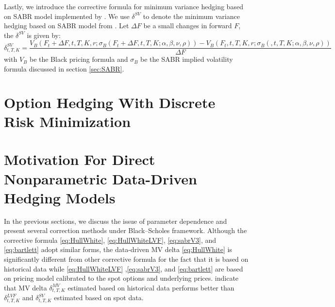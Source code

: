 \documentclass[letterpaper,12pt,titlepage,oneside,final]{book}
\numberwithin{equation}{section}
\theoremstyle{definition}
\begin{document}
Lastly, we introduce the corrective formula for minimum variance hedging  based on  SABR model implemented by  \citet{hulloptimal} . We use $\delta^{SV}$ to denote the minimum variance hedging  based on  SABR model from \cite{hulloptimal}. Let $\Delta F$ be a small changes in forward $F$, the  $\delta^{SV}$ is given by:
\begin{equation}
	\delta^{SV}_{t,T,K}=\frac{V_B(F_t+\Delta F,t,T,K,r;\sigma_B (F_t+\Delta F,t,T,K;\alpha,\beta,\nu,\rho))-V_B(F_t,t,T,K,r;\sigma_B (,t,T,K;\alpha,\beta,\nu,\rho))}{\Delta F}
	\label{eq:HullWhiteSabr}
\end{equation}
with $V_B$ be the Black pricing formula and $\sigma_B$ be the SABR implied volatility formula discussed in section \ref{sec:SABR}. 
\section{Option Hedging With Discrete Risk Minimization}



\section{Motivation For Direct Nonparametric Data-Driven Hedging Models}
In the previous sections, we discuss the issue of parameter dependence and present several correction methods under Black–Scholes framework. Although the corrective formula   \eqref{eq:HullWhite}, \eqref{eq:HullWhiteLVF}, \eqref{eq:sabrV3}, and \eqref{eq:bartlett} adopt similar forms, the data-driven MV delta \eqref{eq:HullWhite} is significantly different from other corrective formula for the fact that it is based on historical data while \eqref{eq:HullWhiteLVF} ,\eqref{eq:sabrV3}, and \eqref{eq:bartlett} are based on pricing model calibrated to the spot options and underlying prices. \citet{hulloptimal} indicate that MV delta $\delta^{MV}_{t,T,K}$ estimated based on historical data performs better than $\delta^{LVF}_{t,T,K}$ and $\delta^{SV}_{t,T,K}$ estimated based on spot data. 
\end{document}
